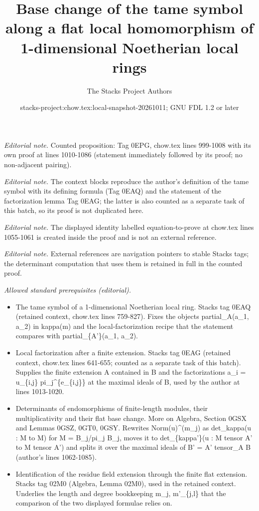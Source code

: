 \documentclass[10pt,a4paper]{amsart}
\title{Base change of the tame symbol along a flat local homomorphism of 1-dimensional Noetherian local rings}
\author{The Stacks Project Authors}
\date{stacks-project:chow.tex:local-snapshot-20261011; GNU FDL 1.2 or later}
\theoremstyle{plain}
\theoremstyle{definition}
\theoremstyle{remark}
\numberwithin{equation}{subsection}
\begin{document}
\maketitle
\noindent\textit{Editorial note.} Counted proposition: Tag 0EPG, chow.tex lines 999-1008 with its own proof at lines 1010-1086 (statement immediately followed by its proof; no non-adjacent pairing).\par\medskip
\noindent\textit{Editorial note.} The context blocks reproduce the author's definition of the tame symbol with its defining formula (Tag 0EAQ) and the statement of the factorization lemma Tag 0EAG; the latter is also counted as a separate task of this batch, so its proof is not duplicated here.\par\medskip
\noindent\textit{Editorial note.} The displayed identity labelled equation-to-prove at chow.tex lines 1055-1061 is created inside the proof and is not an external reference.\par\medskip
\noindent\textit{Editorial note.} External references are navigation pointers to stable Stacks tags; the determinant computation that uses them is retained in full in the counted proof.\par\medskip
\noindent\textit{Allowed standard prerequisites (editorial).}\begin{itemize}
\item The tame symbol of a 1-dimensional Noetherian local ring. Stacks tag 0EAQ (retained context, chow.tex lines 759-827). Fixes the objects partial\_A(a\_1, a\_2) in kappa(m) and the local-factorization recipe that the statement compares with partial\_\{A'\}(a\_1, a\_2).
\item Local factorization after a finite extension. Stacks tag 0EAG (retained context, chow.tex lines 641-655; counted as a separate task of this batch). Supplies the finite extension A contained in B and the factorizations a\_i = u\_\{i,j\} pi\_j\textasciicircum{}\{e\_\{i,j\}\} at the maximal ideals of B, used by the author at lines 1013-1020.
\item Determinants of endomorphisms of finite-length modules, their multiplicativity and their flat base change. More on Algebra, Section 0GSX and Lemmas 0GSZ, 0GT0, 0GSY. Rewrites Norm(u)\textasciicircum{}(m\_j) as det\_kappa(u : M to M) for M = B\_j/pi\_j B\_j, moves it to det\_\{kappa'\}(u : M tensor A' to M tensor A') and splits it over the maximal ideals of B' = A' tensor\_A B (author's lines 1062-1085).
\item Identification of the residue field extension through the finite flat extension. Stacks tag 02M0 (Algebra, Lemma 02M0), used in the retained context. Underlies the length and degree bookkeeping m\_j, m'\_\{j,l\} that the comparison of the two displayed formulae relies on.
\end{itemize}\medskip
\end{document}
